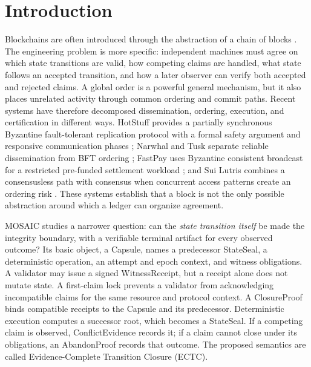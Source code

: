 \documentclass{ledger}
\begin{document}
\section{Introduction}
Blockchains are often introduced through the abstraction of a chain of blocks \cite{Nakamoto2008}. The engineering problem is more specific: independent machines must agree on which state transitions are valid, how competing claims are handled, what state follows an accepted transition, and how a later observer can verify both accepted and rejected claims. A global order is a powerful general mechanism, but it also places unrelated activity through common ordering and commit paths. Recent systems have therefore decomposed dissemination, ordering, execution, and certification in different ways. HotStuff provides a partially synchronous Byzantine fault-tolerant replication protocol with a formal safety argument and responsive communication phases \cite{Yin2019HotStuff}; Narwhal and Tusk separate reliable dissemination from BFT ordering \cite{Danezis2022Narwhal}; FastPay uses Byzantine consistent broadcast for a restricted pre-funded settlement workload \cite{Baudet2020FastPay}; and Sui Lutris combines a consensusless path with consensus when concurrent access patterns create an ordering risk \cite{Blackshear2024SuiLutris}. These systems establish that a block is not the only possible abstraction around which a ledger can organize agreement.

MOSAIC studies a narrower question: can the \emph{state transition itself} be made the integrity boundary, with a verifiable terminal artifact for every observed outcome? Its basic object, a Capsule, names a predecessor StateSeal, a deterministic operation, an attempt and epoch context, and witness obligations. A validator may issue a signed WitnessReceipt, but a receipt alone does not mutate state. A first-claim lock prevents a validator from acknowledging incompatible claims for the same resource and protocol context. A ClosureProof binds compatible receipts to the Capsule and its predecessor. Deterministic execution computes a successor root, which becomes a StateSeal. If a competing claim is observed, ConflictEvidence records it; if a claim cannot close under its obligations, an AbandonProof records that outcome. The proposed semantics are called Evidence-Complete Transition Closure (ECTC).
\end{document}
